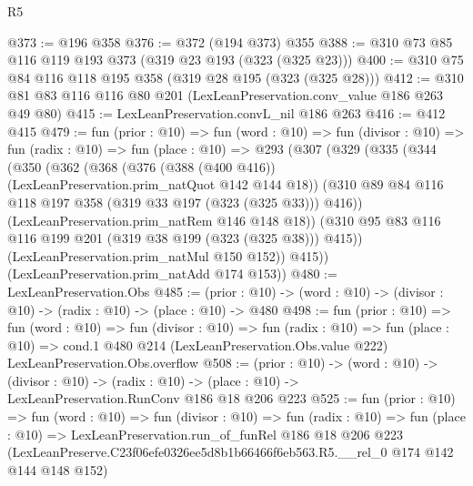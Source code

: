 \begin{lexlean}{R5}
\begin{coremodule}
@373 := @196 @358
@376 := @372 (@194 @373) @355
@388 := @310 @73 @85 @116 @119 @193 @373 (@319 @23 @193 (@323 (@325 @23)))
@400 := @310 @75 @84 @116 @118 @195 @358 (@319 @28 @195 (@323 (@325 @28)))
@412 := @310 @81 @83 @116 @116 @80 @201 (LexLeanPreservation.conv_value @186 @263 @49 @80)
@415 := LexLeanPreservation.convL_nil @186 @263
@416 := @412 @415
@479 := fun (prior : @10) =>
  fun (word : @10) =>
  fun (divisor : @10) =>
  fun (radix : @10) =>
  fun (place : @10) =>
  @293
    (@307
      (@329
        (@335
          (@344
            (@350
              (@362
                (@368
                  (@376 (@388 (@400 @416)) (LexLeanPreservation.prim_natQuot @142 @144 @18))
                  (@310 @89 @84 @116 @118 @197 @358 (@319 @33 @197 (@323 (@325 @33))) @416))
                (LexLeanPreservation.prim_natRem @146 @148 @18))
              (@310 @95 @83 @116 @116 @199 @201 (@319 @38 @199 (@323 (@325 @38))) @415))
            (LexLeanPreservation.prim_natMul @150 @152))
          @415))
      (LexLeanPreservation.prim_natAdd @174 @153))
@480 := LexLeanPreservation.Obs
@485 := (prior : @10) -> (word : @10) -> (divisor : @10) -> (radix : @10) -> (place : @10) -> @480
@498 := fun (prior : @10) =>
  fun (word : @10) =>
  fun (divisor : @10) =>
  fun (radix : @10) =>
  fun (place : @10) =>
  cond.{1} @480 @214 (LexLeanPreservation.Obs.value @222) LexLeanPreservation.Obs.overflow
@508 := (prior : @10) ->
  (word : @10) ->
  (divisor : @10) ->
  (radix : @10) -> (place : @10) -> LexLeanPreservation.RunConv @186 @18 @206 @223
@525 := fun (prior : @10) =>
  fun (word : @10) =>
  fun (divisor : @10) =>
  fun (radix : @10) =>
  fun (place : @10) =>
  LexLeanPreservation.run_of_funRel
    @186
    @18
    @206
    @223
    (LexLeanPreserve.C23f06efe0326ee5d8b1b66466f6eb563.R5.__rel_0 @174 @142 @144 @148 @152)
\end{coremodule}
\end{lexlean}
